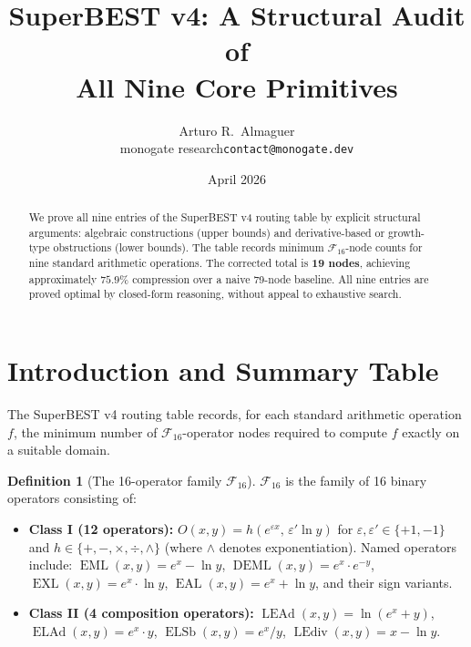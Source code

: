\documentclass[12pt,a4paper]{article}
\title{SuperBEST v4: A Structural Audit of\\
       All Nine Core Primitives}
\author{Arturo R.\ Almaguer\\
  \small monogate research\quad\texttt{contact@monogate.dev}}
\date{April 2026}
\theoremstyle{definition}
\newtheorem{definition}[theorem]{Definition}
\newcommand{\EML}{\operatorname{EML}}
\newcommand{\EXL}{\operatorname{EXL}}
\newcommand{\EAL}{\operatorname{EAL}}
\newcommand{\DEML}{\operatorname{DEML}}
\newcommand{\ELAd}{\operatorname{ELAd}}
\newcommand{\ELSb}{\operatorname{ELSb}}
\newcommand{\LEAd}{\operatorname{LEAd}}
\newcommand{\LEdiv}{\operatorname{LEdiv}}
\newcommand{\F}{\mathcal{F}_{16}}
\begin{document}
\maketitle

\begin{abstract}
We prove all nine entries of the SuperBEST v4 routing table by explicit
structural arguments: algebraic constructions (upper bounds) and derivative-based
or growth-type obstructions (lower bounds).  The table records minimum
$\mathcal{F}_{16}$-node counts for nine standard arithmetic operations.
The corrected total is \textbf{19 nodes}, achieving approximately $75.9\%$
compression over a naive 79-node baseline.  All nine entries are proved optimal
by closed-form reasoning, without appeal to exhaustive search.
\end{abstract}

\tableofcontents

\section{Introduction and Summary Table}
\label{sec:intro}

The SuperBEST v4 routing table records, for each standard arithmetic operation
$f$, the minimum number of $\mathcal{F}_{16}$-operator nodes required to compute
$f$ exactly on a suitable domain.

\begin{definition}[The 16-operator family $\F$]
\label{def:F16}
$\F$ is the family of 16 binary operators consisting of:
\begin{itemize}
  \item \textbf{Class I (12 operators):} $O(x,y) = h(e^{\varepsilon x},\,\varepsilon'\ln y)$
    for $\varepsilon,\varepsilon'\in\{+1,-1\}$ and $h\in\{+,-,\times,\div,\wedge\}$
    (where $\wedge$ denotes exponentiation).
    Named operators include: $\EML(x,y) = e^x - \ln y$,
    $\DEML(x,y) = e^x \cdot e^{-y}$, $\EXL(x,y) = e^x \cdot \ln y$,
    $\EAL(x,y) = e^x + \ln y$, and their sign variants.
  \item \textbf{Class II (4 composition operators):}
    $\LEAd(x,y) = \ln(e^x + y)$,\quad
    $\ELAd(x,y) = e^x \cdot y$,\quad
    $\ELSb(x,y) = e^x / y$,\quad
    $\LEdiv(x,y) = x - \ln y$.
\end{itemize}
\end{definition}
\end{document}
